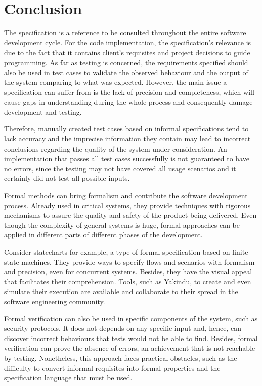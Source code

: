 \chapter{Conclusion}
\label{cap:conclusoes}

The specification is a reference to be consulted throughout the entire software development cycle. For the code implementation, the specification's relevance is due to the fact that it contains client's requisites and project decisions to guide programming. As far as testing is concerned, the requirements specified should also be used in test cases to validate the observed behaviour and the output of the system comparing to what was expected. However, the main issue a specification can suffer from is the lack of precision and completeness, which will cause gaps in understanding during the whole process and consequently damage development and testing.

Therefore, manually created test cases based on informal specifications tend to lack accuracy and the imprecise information they contain may lead to incorrect conclusions regarding the quality of the system under consideration. An implementation that passes all test cases successfully is not guaranteed to have no errors, since the testing may not have covered all usage scenarios and it certainly did not test all possible inputs.

Formal methods can bring formalism and contribute the software development process. Already used in critical systems, they provide techniques with rigorous mechanisms to assure the quality and safety of the product being delivered. Even though the complexity of general systems is huge, formal approaches can be applied in different parts of different phases of the development.

Consider statecharts for example, a type of formal specification based on finite state machines. They provide ways to specify flows and scenarios with formalism and precision, even for concurrent systems. Besides, they have the visual appeal that facilitates their comprehension. Tools, such as Yakindu, to create and even simulate their execution are available and collaborate to their spread in the software engineering community.

Formal verification can also be used in specific components of the system, such as security protocols. It does not depends on any specific input and, hence, can discover incorrect behaviours that tests would not be able to find. Besides, formal verification can prove the absence of errors, an achievement that is not reachable by testing. Nonetheless, this approach faces practical obstacles, such as the difficulty to convert informal requisites into formal properties and the specification language that must be used.

